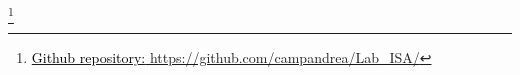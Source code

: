 {\let\thefootnote\relax\footnote{{\href{https://github.com/campandrea/Lab_ISA/}{\textcolor{black}{Github repository:} https://github.com/campandrea/Lab\_ISA/}}}}


